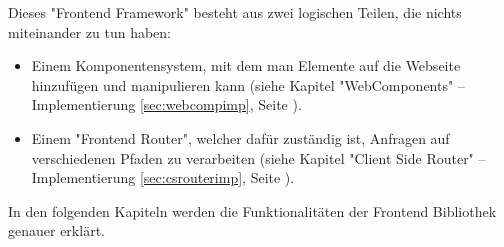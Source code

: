Dieses "Frontend Framework" besteht aus zwei logischen Teilen, die nichts miteinander zu tun haben:
\begin{itemize}
    \item Einem Komponentensystem, mit dem man Elemente auf die Webseite hinzufügen und manipulieren kann (siehe Kapitel "WebComponents" -- Implementierung \ref{sec:webcompimp}, Seite \pageref{sec:webcompimp}).
    \item Einem "Frontend Router", welcher dafür zuständig ist, Anfragen auf verschiedenen Pfaden zu verarbeiten (siehe Kapitel "Client Side Router" -- Implementierung \ref{sec:csrouterimp}, Seite \pageref{sec:csrouterimp}).
\end{itemize}

In den folgenden Kapiteln werden die Funktionalitäten der Frontend Bibliothek genauer erklärt.